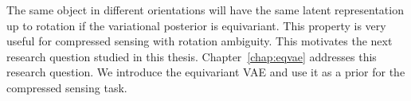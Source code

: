 The same object in different orientations will have the same latent representation up to rotation if the variational posterior is equivariant.
This property is very useful for compressed sensing with rotation ambiguity. 
This motivates the next research question studied in this thesis. 
Chapter~\ref{chap:eqvae} addresses this research question. We introduce the equivariant VAE and use it as a prior for the compressed sensing task. 



